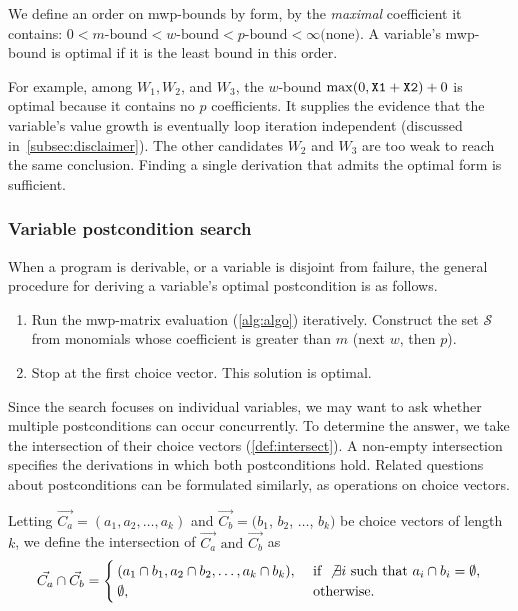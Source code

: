 \begin{definition}[Optimality]
    We define an order on mwp-bounds by form, by the \emph{maximal} coefficient it contains:
    \(0 < m\text{-bound} < w\text{-bound} < p\text{-bound} < \infty \text{(none)}\).
    A variable's mwp-bound is optimal if it is the least bound in this order.
\end{definition}

\noindent For example, among \( W_1, W_2\), and \(W_3\),
the \(w\)-bound \(\max(0,\prm{X1}+\prm{X2})+0\) is optimal because it contains no \(p\) coefficients.
It supplies the evidence that the variable's value growth is eventually loop iteration independent (discussed in~\autoref{subsec:disclaimer}).
The other candidates \( W_2\) and \(W_3\) are too weak to reach the same conclusion.
Finding a single derivation that admits the optimal form is sufficient.

\subsubsection{Variable postcondition search}
\label{subsec:pc-search}

When a program is derivable, or a variable is disjoint from failure,
the general procedure for deriving a variable's optimal postcondition is as follows.

\begin{enumerate}
    \item Run the mwp-matrix evaluation (\autoref{alg:algo}) iteratively.
    Construct the set \(\mathcal{S}\) from monomials whose coefficient is greater than \(m\) (next \(w\), then \(p\)).
    \item Stop at the first choice vector.
    This solution is optimal.
\end{enumerate}

\noindent
Since the search focuses on individual variables, we may want to ask whether multiple postconditions can occur concurrently.
To determine the answer, we take the intersection of their choice vectors (\autoref{def:intersect}).
A non-empty intersection specifies the derivations in which both postconditions hold.
Related questions about postconditions can be formulated similarly, as operations on choice vectors.

\begin{definition}\label{def:intersect}
Letting \(\vec{C_a} = (a_1, a_2,\dots,a_k) \) and \(\vec{C_b} = (b_1\), \(b_2\), \(\dots\), \(b_k)\) be choice vectors of length \(k\),
we define the intersection of \(\vec{C_a} \text{ and } \vec{C_b} \) as
\[ \vec{C_a} \cap \vec{C_b} = \begin{cases}
(a_1 \cap b_1, a_2 \cap b_2, \dots, a_k \cap b_k), & \text{ if } \not\exists i \text{ such that } a_i \cap b_i = \emptyset, \\
\emptyset, & \text{ otherwise.}\end{cases}
\]%
\end{definition}

